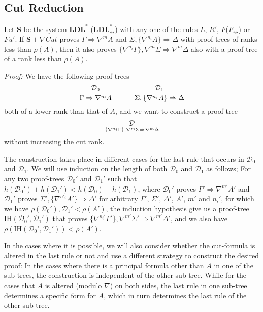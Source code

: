 \documentclass[a4paper, 12pt]{paper}
\begin{document}
\subsection*{Cut Reduction}
  Let \textbf{S} be the system $\mathbf{LDL}^{*}$ ($\mathbf{LDL}^{*}_{\rightsquigarrow}$) with any one of the rules $L$, $R'$, $F$($F_\rightsquigarrow$) or $Fu'$. If $\mathbf{S} + \nabla Cut$ proves $\Gamma \Rightarrow \nabla^m A$ and $\Sigma , \{\nabla^{n_i} A\} \Rightarrow \Delta$ with proof trees of ranks less than $\rho(A)$, then it also proves $\{\nabla^{n_i} \Gamma\} , \nabla^m\Sigma \Rightarrow \nabla^m\Delta$ also with a proof tree of a rank less than $\rho(A)$.

  \emph{Proof:} We have the following proof-trees
  \[
    {\mathcal{D}_0
    \atop
    \Gamma \Rightarrow \nabla^m A}
    \hspace{3em}
    {\mathcal{D}_1
    \atop
    \Sigma , \{\nabla^{n_i} A\} \Rightarrow \Delta}
  \]
  both of a lower rank than that of $A$, and we want to construct a proof-tree
  \[\mathcal{D} \atop \{\nabla^{n_i} \Gamma\} , \nabla^m \Sigma \Rightarrow \nabla^m \Delta \]
  without increasing the cut rank.

  The construction takes place in different cases for the last rule that occurs in $\mathcal{D}_0$ and $\mathcal{D}_1$. 
  We will use induction on the length of both $\mathcal{D}_0$ and $\mathcal{D}_1$ as follows; For any two proof-trees $\mathcal{D}_0'$ and $\mathcal{D}_1'$ such that $h(\mathcal{D}_0') + h(\mathcal{D}_1') < h(\mathcal{D}_0) + h(\mathcal{D}_1)$, where $\mathcal{D}_0'$ proves $\Gamma' \Rightarrow \nabla^{m'} A'$ and $\mathcal{D}_1'$ proves $\Sigma', \{\nabla^{n'_i} A'\} \Rightarrow \Delta'$ for arbitrary $\Gamma'$, $\Sigma'$, $\Delta'$, $A'$, $m'$ and $n_i'$, for which we have $\rho(\mathcal{D}_0'),\mathcal{D}_1' < \rho(A')$, the induction hypothesis give us a proof-tree $\text{IH}(\mathcal{D}_0', \mathcal{D}_1')$ that proves $\{\nabla^{n_i'}\Gamma'\}, \nabla^{m'} \Sigma' \Rightarrow \nabla^{m'} \Delta'$, and we also have $\rho(\text{IH}(\mathcal{D}_0', \mathcal{D}_1')) < \rho(A')$.

  In the cases where it is possible, we will also consider whether the cut-formula is altered in the last rule or not and use a different strategy to construct the desired proof: In the cases where there is a principal formula other than $A$ in one of the sub-trees, the construction is independent of the other sub-tree. While for the cases that $A$ is altered (modulo $\nabla$) on both sides, the last rule in one sub-tree determines a specific form for $A$, which in turn determines the last rule of the other sub-tree.
  
\end{document}
